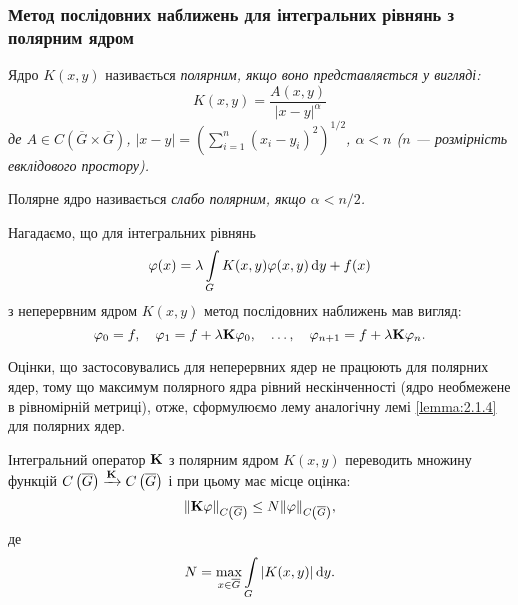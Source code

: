 % 


% 

% 


% 


\subsubsection{Метод послідовних наближень для інтегральних рівнянь з полярним ядром}

\begin{definition}
	Ядро $K(x, y)$ називається \it{полярним}, якщо воно представляється у вигляді:
	\begin{equation}
		K(x, y) = \dfrac{A(x, y)}{|x - y|^\alpha}
	\end{equation}
	де $A \in C\left(\overline G \times \overline G\right)$, $|x - y| = \left( \sum_{i = 1}^n (x_i - y_i)^2 \right)^{1/2}$, $\alpha < n$ ($n$ --- розмірність евклідового простору).
\end{definition}

\begin{definition}
	Полярне ядро називається \it{слабо полярним}, якщо $\alpha < n / 2$.
\end{definition}

Нагадаємо, що для інтегральних рівнянь 
\begin{equation}
	\phi(x) = \lambda \Int_G K(x, y) \phi(x, y) \diff y + f(x)
\end{equation}
з неперервним ядром $K(x, y)$ метод послідовних наближень мав вигляд: 
\begin{equation}
	\phi_0 = f, \quad \phi_1 = f + \lambda \bf{K} \phi_0, \quad \ldots, \quad \phi_{n + 1} = f + \lambda \bf{K} \phi_n.
\end{equation}	

Оцінки, що застосовувались для неперервних ядер не працюють для полярних ядер, тому що максимум полярного ядра рівний нескінченності (ядро необмежене в рівномірній метриці), отже, сформулюємо лему аналогічну лемі \ref{lemma:2.1.4} для полярних ядер. 

\begin{lemma}
	Інтегральний оператор $\bf{K}$ з полярним ядром $K(x, y)$ переводить множину функцій $C\left(\overline G\right) \xrightarrow{\bf{K}} C \left(\overline G\right)$ і при цьому має місце оцінка: 
	\begin{equation}
		\| \bf{K} \phi \|_{C\left(\overline G\right)} \le N \| \phi\|_{C\left(\overline G\right)},
	\end{equation}
	де 
	\begin{equation}
		N = \Max_{x \in \overline G} \Int_G |K(x, y)| \diff y.
	\end{equation}
\end{lemma}

